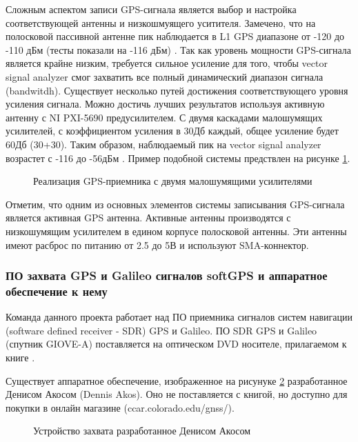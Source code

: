 Сложным аспектом записи GPS-сигнала является выбор и настройка соответствующей антенны и низкошмуящего уситителя.
Замечено, что на полосковой пассивной антенне пик наблюдается в L1 GPS диапазоне от -120 до -110 дБм
(тесты показали на -116 дБм) \cite{ni_article}. Так как уровень
мощности GPS-сигнала является крайне низким, требуется сильное усиление для того, чтобы vector signal
analyzer смог захватить все полный динамический диапазон сигнала (bandwitdh). Существует несколько путей достижения
соответствующего уровня усиления сигнала. Можно достичь лучших результатов используя активную антенну с NI PXI-5690
предусилителем. С двумя каскадами малошумящих усилителей, с коэффициентом усиления в 30Дб каждый, общее усиление будет
60Дб (30+30). Таким образом, наблюдаемый пик на vector signal analyzer возрастет с -116 до -56дБм \cite{ni_article}.
Пример подобной системы предствлен на рисунке \ref{pic:ni_gps_receiver}.

\begin{figure}[H]
\begin{center}
\end{center}
\caption{Реализация GPS-приемника с двумя малошумящими усилителями}
\label{pic:ni_gps_receiver}
\end{figure}

Отметим, что одним из основных элементов системы записывания GPS-сигнала является активная GPS антенна. Активные антенны
производятся с низкошумящим усилителем в едином корпусе полосковой антенны. Эти антенны имеют расброс по питанию от 2.5 до
5В и используют SMA-коннектор. 

\subsubsection*{ПО захвата GPS и Galileo сигналов softGPS и аппаратное обеспечение к нему}
Команда данного проекта работает над ПО приемника сигналов систем навигации (software defined receiver - SDR) GPS и Galileo. ПО SDR
GPS и Galileo (спутник GIOVE-A) поставляется на оптическом DVD носителе, прилагаемом к книге \cite{gps}.

Существует аппаратное обеспечение, изображенное на рисунуке \ref{pic:softGPS} разработанное Денисом Акосом (Dennis Akos). Оно не поставляется с книгой, но 
доступно для покупки в онлайн магазине (ccar.colorado.edu/gnss/).

\begin{figure}[H]
\begin{center}
\end{center}
\caption{Устройство захвата разработанное Денисом Акосом}
\label{pic:softGPS}
\end{figure}

